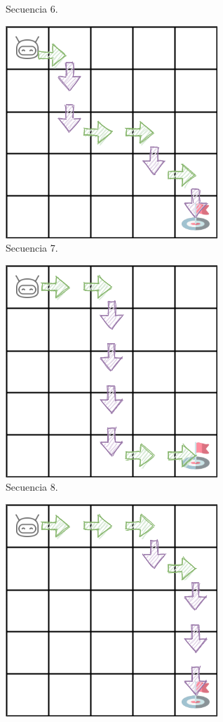 \begin{figure}
\begin{subfigure}{.35\textwidth}
        \caption{Secuencia 6.}
        \label{fig:seq6}
    \end{subfigure}
    \begin{subfigure}{.35\textwidth}
        \centering
        \includegraphics[scale=0.4]{cap5_experimentacion/images/dim5_actions_313.png}
        \caption{Secuencia 7.}
        \label{fig:seq7}
    \end{subfigure}%
    \begin{subfigure}{.35\textwidth}
        \centering
        \includegraphics[scale=0.4]{cap5_experimentacion/images/dim5_lr0.01_ep0_453.png}
        \caption{Secuencia 8.}
        \label{fig:seq8}
    \end{subfigure}%
    \begin{subfigure}{.35\textwidth}
        \centering
        \includegraphics[scale=0.4]{cap5_experimentacion/images/dim5_lr0.01_ep0.2_458.png}

\end{subfigure}
\end{figure}
